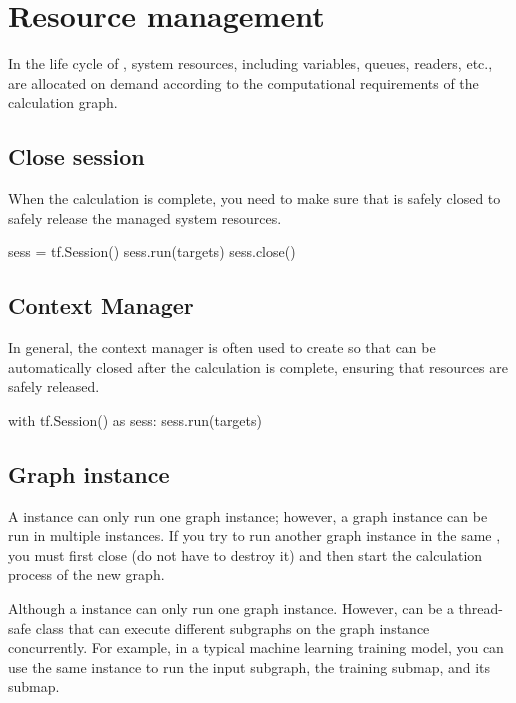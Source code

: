 \section{Resource management}
\begin{content}
In the life cycle of , system resources, including variables, queues, readers, etc., are allocated on demand according to the computational requirements of the calculation graph.


\subsection{Close session}
When the calculation is complete, you need to make sure that  is safely closed to safely release the managed system resources.

\begin{leftbar}
\begin{python}
sess = tf.Session()
sess.run(targets)
sess.close()
\end{python}
\end{leftbar}


\subsection{Context Manager}
In general, the context manager is often used to create  so that  can be automatically closed after the calculation is complete, ensuring that resources are safely released.

\begin{leftbar}
\begin{python}
with tf.Session() as sess:
  sess.run(targets)
\end{python}
\end{leftbar}


\subsection{Graph instance}
A  instance can only run one graph instance; however, a graph instance can be run in multiple  instances. If you try to run another graph instance in the same , you must first close  (do not have to destroy it) and then start the calculation process of the new graph.

Although a  instance can only run one graph instance. However,  can be a thread-safe class that can execute different subgraphs on the graph instance concurrently. For example, in a typical machine learning training model, you can use the same  instance to run the input subgraph, the training submap, and its  submap.



\end{content}
